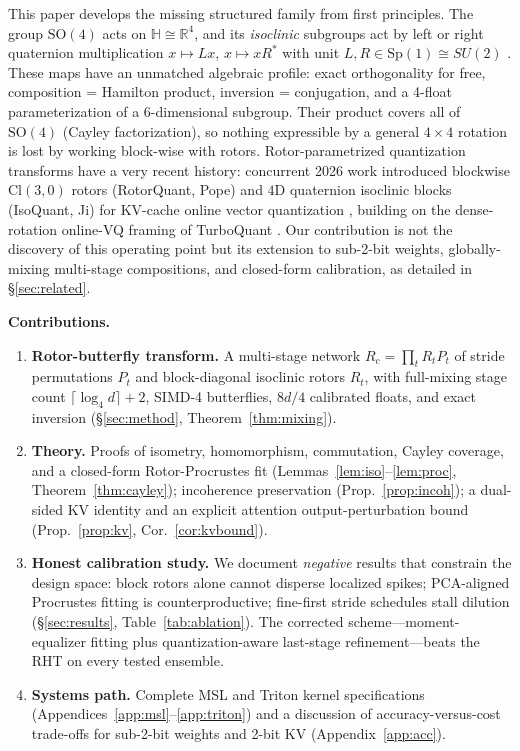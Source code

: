 \documentclass{article}
\newcommand{\R}{\mathbb{R}}
\newcommand{\SO}{\mathrm{SO}}
\newcommand{\Sp}{\mathrm{Sp}}
\begin{document}
This paper develops the missing structured family from first principles. The
group $\SO(4)$ acts on $\mathbb{H}\cong\R^4$, and its \emph{isoclinic}
subgroups act by left or right quaternion multiplication
$x\mapsto Lx$, $x\mapsto xR^{*}$ with unit $L,R\in\Sp(1)\cong SU(2)$
\citep{conway2003quaternions,thomas2015cayley}. These maps have an unmatched
algebraic profile: exact orthogonality for free, composition = Hamilton
product, inversion = conjugation, and a 4-float parameterization of a
6-dimensional subgroup. Their product covers all of $\SO(4)$ (Cayley
factorization), so nothing expressible by a general $4\times4$ rotation is lost
by working block-wise with rotors. Rotor-parametrized quantization transforms
have a very recent history: concurrent 2026 work introduced blockwise
$\mathrm{Cl}(3,0)$ rotors (RotorQuant, Pope) and $4$D quaternion isoclinic
blocks (IsoQuant, Ji) for KV-cache online vector quantization
\citep{pope2026rotorquant,ji2026isoquant}, building on the dense-rotation
online-VQ framing of TurboQuant \citep{google2025turboquant}. Our contribution
is not the discovery of this operating point but its extension to sub-2-bit
weights, globally-mixing multi-stage compositions, and closed-form calibration,
as detailed in \S\ref{sec:related}.

\textbf{Contributions.}
\begin{enumerate}[leftmargin=1.5em,itemsep=1pt,topsep=2pt]
\item \textbf{Rotor-butterfly transform.} A multi-stage network
$R_c=\prod_t R_tP_t$ of stride permutations $P_t$ and block-diagonal isoclinic
rotors $R_t$, with full-mixing stage count $\lceil\log_4 d\rceil+2$, SIMD-4
butterflies, $8d/4$ calibrated floats, and exact inversion
(\S\ref{sec:method}, Theorem~\ref{thm:mixing}).
\item \textbf{Theory.} Proofs of isometry, homomorphism, commutation, Cayley
coverage, and a closed-form Rotor-Procrustes fit
(Lemmas~\ref{lem:iso}--\ref{lem:proc}, Theorem~\ref{thm:cayley}); incoherence
preservation (Prop.~\ref{prop:incoh}); a dual-sided KV identity and an explicit
attention output-perturbation bound (Prop.~\ref{prop:kv},
Cor.~\ref{cor:kvbound}).
\item \textbf{Honest calibration study.} We document \emph{negative} results
that constrain the design space: block rotors alone cannot disperse localized
spikes; PCA-aligned Procrustes fitting is counterproductive; fine-first stride
schedules stall dilution (\S\ref{sec:results}, Table~\ref{tab:ablation}).
The corrected scheme---moment-equalizer fitting plus quantization-aware
last-stage refinement---beats the RHT on every tested ensemble.
\item \textbf{Systems path.} Complete MSL and Triton kernel specifications
(Appendices~\ref{app:msl}--\ref{app:triton}) and a discussion of accuracy-versus-cost
trade-offs for sub-2-bit weights and 2-bit KV (Appendix~\ref{app:acc}).
\end{enumerate}
\end{document}
